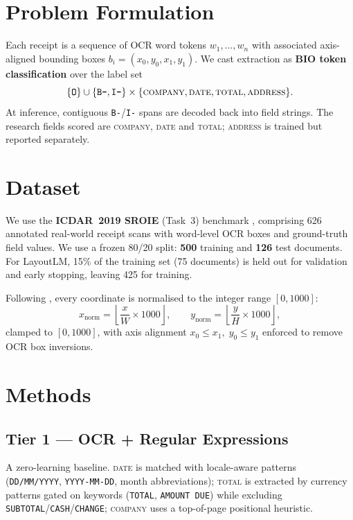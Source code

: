 \documentclass[11pt]{article}
\begin{document}
\section{Problem Formulation}
Each receipt is a sequence of OCR word tokens $w_1,\dots,w_n$ with associated
axis-aligned bounding boxes $b_i=(x_0,y_0,x_1,y_1)$. We cast extraction as
\textbf{BIO token classification} over the label set
\[
\{\texttt{O}\}\cup\{\texttt{B-},\texttt{I-}\}\times
\{\textsc{company},\textsc{date},\textsc{total},\textsc{address}\}.
\]
At inference, contiguous \texttt{B-}/\texttt{I-} spans are decoded back into field
strings. The research fields scored are \textsc{company}, \textsc{date} and
\textsc{total}; \textsc{address} is trained but reported separately.

\section{Dataset}
We use the \textbf{ICDAR~2019 SROIE} (Task~3) benchmark \citep{huang2019sroie},
comprising 626 annotated real-world receipt scans with word-level OCR boxes and
ground-truth field values. We use a frozen 80/20 split: \textbf{500} training and
\textbf{126} test documents. For LayoutLM, 15\% of the training set (75 documents)
is held out for validation and early stopping, leaving 425 for training.

Following \citet{xu2020layoutlm}, every coordinate is normalised to the integer
range $[0,1000]$:
\begin{equation}
x_{\text{norm}}=\left\lfloor \frac{x}{W}\times 1000 \right\rfloor,\qquad
y_{\text{norm}}=\left\lfloor \frac{y}{H}\times 1000 \right\rfloor,
\end{equation}
clamped to $[0,1000]$, with axis alignment $x_0\le x_1,\; y_0\le y_1$ enforced to
remove OCR box inversions.

\section{Methods}
\subsection{Tier 1 --- OCR + Regular Expressions}
A zero-learning baseline. \textsc{date} is matched with locale-aware patterns
(\texttt{DD/MM/YYYY}, \texttt{YYYY-MM-DD}, month abbreviations); \textsc{total} is
extracted by currency patterns gated on keywords (\texttt{TOTAL},
\texttt{AMOUNT DUE}) while excluding \texttt{SUBTOTAL}/\texttt{CASH}/\texttt{CHANGE};
\textsc{company} uses a top-of-page positional heuristic.
\end{document}
